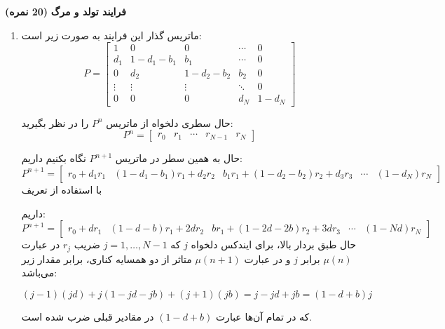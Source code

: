 \Large \textbf{فرایند تولد و مرگ}
\large \textbf{(20 نمره)}

\normalsize \vspace{0.5cm}

\begin{enumerate}[label=(\alph*)]
	\item
	ماتریس گذار این فرایند به صورت زیر است:
	$$
	P = \left[ {\begin{array}{*{20}{c}}
			1&0&0& \cdots &0\\
			{{d_1}}&{1 - {d_1} - {b_1}}&{{b_1}}& \cdots &0\\
			0&{{d_2}}&{1 - {d_2} - {b_2}}&{{b_2}}&0\\
			\vdots & \vdots & \vdots & \ddots &0\\
			0&0&0&{{d_N}}&{1 - {d_N}}
	\end{array}} \right]
	$$
	
	حال سطری دلخواه از ماتریس
	${P^n}$
	را در نظر بگیرید:
	$$
	{P^n} = \left[ {\begin{array}{*{20}{c}}
			{{r_0}}&{{r_1}}& \cdots &{{r_{N - 1}}}&{{r_N}}
	\end{array}} \right]
	$$
	
	حال به همین سطر در ماتریس
	${P^{n + 1}}$
	نگاه بکنیم داریم:
	$$
	{P^{n + 1}} = \left[ {\begin{array}{*{20}{c}}
			{{r_0} + {d_1}{r_1}}&{\left( {1 - {d_1} - {b_1}} \right){r_1} + {d_2}{r_2}}&{{b_1}{r_1} + \left( {1 - {d_2} - {b_2}} \right){r_2} + {d_3}{r_3}}& \cdots &{\left( {1 - {d_N}} \right){r_N}}
	\end{array}} \right]
	$$
	با استفاده از تعریف
	
	داریم:
	$$
	{P^{n + 1}} = \left[ {\begin{array}{*{20}{c}}
			{{r_0} + d{r_1}}&{\left( {1 - d - b} \right){r_1} + 2d{r_2}}&{b{r_1} + \left( {1 - 2d - 2b} \right){r_2} + 3d{r_3}}& \cdots &{\left( {1 - Nd} \right){r_N}}
	\end{array}} \right]
	$$
	حال طبق بردار بالا،‌ برای ایندکس دلخواه
	$j$
	که
	$j = 1, \ldots ,N - 1$
	ضریب
	${r_j}$
	در عبارت
	$\mu \left( n \right)$
	برابر $j$ و در عبارت
	$\mu \left( {n + 1} \right)$
	متاثر از دو همسایه کناری، برابر مقدار زیر می‌باشد:
	
	$$
	\left( {j - 1} \right)\left( {jd} \right) + j\left( {1 - jd - jb} \right) + \left( {j + 1} \right)\left( {jb} \right) = j - jd + jb = \left( {1 - d + b} \right)j
	$$
	
	که در تمام آن‌ها عبارت
	$\left( {1 - d + b} \right)$
	در مقادیر قبلی ضرب شده است.\\
	

\end{enumerate}
